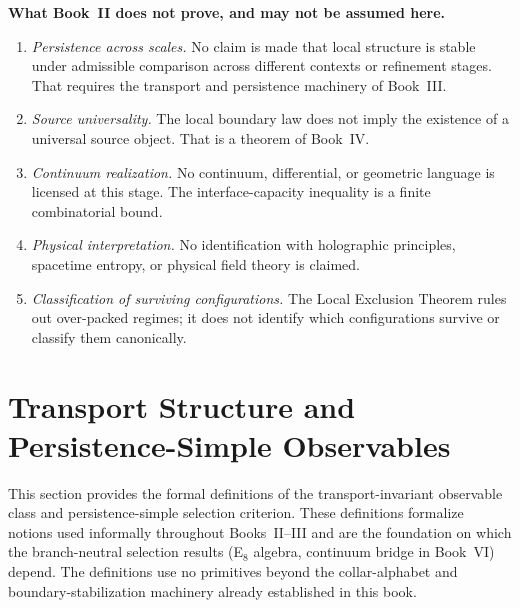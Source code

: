 \documentclass[12pt,oneside]{amsbook}
\theoremstyle{plain}
\theoremstyle{definition}
\theoremstyle{remark}
\begin{document}
\textbf{What Book~II does not prove, and may not be assumed here.}
\begin{enumerate}
  \item \emph{Persistence across scales.}  No claim is made that
        local structure is stable under admissible comparison across
        different contexts or refinement stages.  That requires the
        transport and persistence machinery of Book~III.
  \item \emph{Source universality.}  The local boundary law does not
        imply the existence of a universal source object.  That is a
        theorem of Book~IV.
  \item \emph{Continuum realization.}  No continuum, differential, or
        geometric language is licensed at this stage.  The
        interface-capacity inequality is a finite combinatorial bound.
  \item \emph{Physical interpretation.}  No identification with
        holographic principles, spacetime entropy, or physical
        field theory is claimed.
  \item \emph{Classification of surviving configurations.}  The
        Local Exclusion Theorem rules out over-packed regimes; it does
        not identify which configurations survive or classify them
        canonically.
\end{enumerate}

\section{Transport Structure and Persistence-Simple Observables}
\label{sec:transport-observable-defs}

This section provides the formal definitions of the transport-invariant
observable class and persistence-simple selection criterion.  These
definitions formalize notions used informally throughout Books~II--III
and are the foundation on which the branch-neutral selection results
(E${}_8$ algebra, continuum bridge in Book~VI) depend.  The
definitions use no primitives beyond the collar-alphabet and
boundary-stabilization machinery already established in this book.
\end{document}
